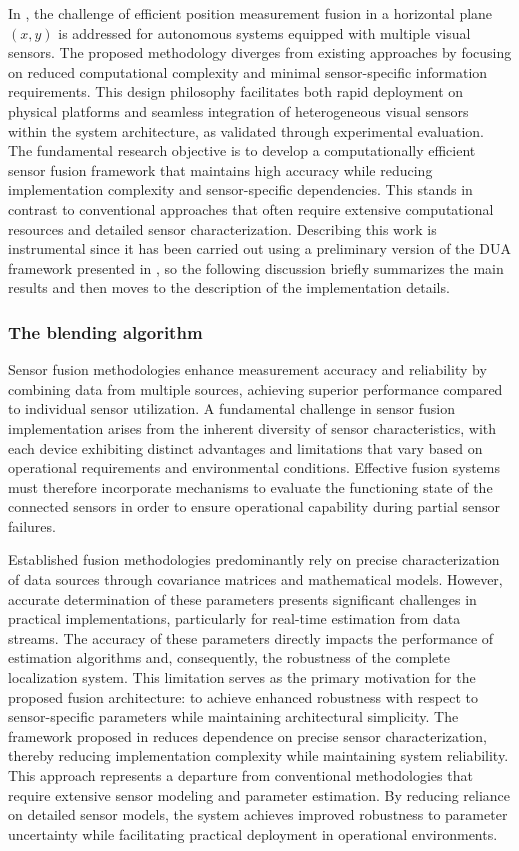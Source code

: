 In \cite{bianchi_efficient_2023}, the challenge of efficient position measurement fusion in a horizontal plane $(x,y)$ is addressed for autonomous systems equipped with multiple visual sensors. The proposed methodology diverges from existing approaches by focusing on reduced computational complexity and minimal sensor-specific information requirements. This design philosophy facilitates both rapid deployment on physical platforms and seamless integration of heterogeneous visual sensors within the system architecture, as validated through experimental evaluation. The fundamental research objective is to develop a computationally efficient sensor fusion framework that maintains high accuracy while reducing implementation complexity and sensor-specific dependencies. This stands in contrast to conventional approaches that often require extensive computational resources and detailed sensor characterization. Describing this work is instrumental since it has been carried out using a preliminary version of the DUA framework presented in , so the following discussion briefly summarizes the main results and then moves to the description of the implementation details.

\subsubsection{The blending algorithm}
\label{sec:robots_results_iccad23_algo}
Sensor fusion methodologies enhance measurement accuracy and reliability by combining data from multiple sources, achieving superior performance compared to individual sensor utilization. A fundamental challenge in sensor fusion implementation arises from the inherent diversity of sensor characteristics, with each device exhibiting distinct advantages and limitations that vary based on operational requirements and environmental conditions. Effective fusion systems must therefore incorporate mechanisms to evaluate the functioning state of the connected sensors in order to ensure operational capability during partial sensor failures.

Established fusion methodologies predominantly rely on precise characterization of data sources through covariance matrices and mathematical models. However, accurate determination of these parameters presents significant challenges in practical implementations, particularly for real-time estimation from data streams. The accuracy of these parameters directly impacts the performance of estimation algorithms and, consequently, the robustness of the complete localization system. This limitation serves as the primary motivation for the proposed fusion architecture: to achieve enhanced robustness with respect to sensor-specific parameters while maintaining architectural simplicity. The framework proposed in \cite{bianchi_efficient_2023} reduces dependence on precise sensor characterization, thereby reducing implementation complexity while maintaining system reliability. This approach represents a departure from conventional methodologies that require extensive sensor modeling and parameter estimation. By reducing reliance on detailed sensor models, the system achieves improved robustness to parameter uncertainty while facilitating practical deployment in operational environments.

